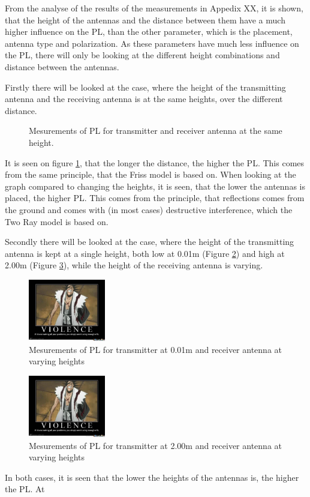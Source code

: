 From the analyse of the results of the measurements in Appedix XX, it is shown, that the height of the antennas and the distance between them have a much higher influence on the PL, than the other parameter, which is the placement, antenna type and polarization. As these parameters have much less influence on the PL, there will only be looking at the different height combinations and distance between the antennas.

Firstly there will be looked at the case, where the height of the transmitting antenna and the receiving antenna is at the same heights, over the different distance.

\begin{figure}
\centering

\caption{Mesurements of PL for transmitter and receiver antenna at the same height.}
\label{Meas1}
\end{figure}

It is seen on figure \ref{Meas1}, that the longer the distance, the higher the PL. This comes from the same principle, that the Friss model is based on. When looking at the graph compared to changing the heights, it is seen, that the lower the antennas is placed, the higher PL. This comes from the principle, that reflections comes from the ground and comes with (in most cases) destructive interference, which the Two Ray model is based on. 

Secondly there will be looked at the case, where the height of the transmitting antenna is kept at a single height, both low at 0.01m (Figure \ref{Meas2}) and high at 2.00m (Figure \ref{Meas3}), while the height of the receiving antenna is varying.

\begin{figure}
\centering
\includegraphics[width=0.3\textwidth]{figures/bleach-3712665.jpg}
\caption{Mesurements of PL for transmitter at 0.01m and receiver antenna at varying heights}
\label{Meas2}
\end{figure}

\begin{figure}
\centering
\includegraphics[width=0.3\textwidth]{figures/bleach-3712665.jpg}
\caption{Mesurements of PL for transmitter at 2.00m and receiver antenna at varying heights}
\label{Meas3}
\end{figure}

In both cases, it is seen that the lower the heights of the antennas is, the higher the PL. At 
